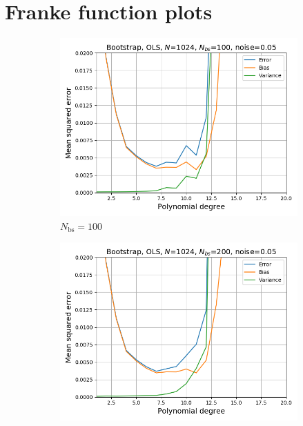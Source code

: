 \documentclass[a4paper]{article}
\begin{document}
\section{Franke function plots} \label{app:Frankeplots}
\begin{figure}[H]
  \centering
  \begin{subfigure}{0.49\textwidth}
    \includegraphics[scale=0.45]{../figures/task_b/bias_variance_N1024_pmax20_nlamb1_noise0.05_seed4155_OLS_boot_Nbs100.png}
    \caption{$N_{\text{bs}} = 100$}
  \end{subfigure}
  \begin{subfigure}{0.49\textwidth}
    \includegraphics[scale=0.45]{../figures/task_b/bias_variance_N1024_pmax20_nlamb1_noise0.05_seed4155_OLS_boot_Nbs200.png}

\end{subfigure}
\end{figure}
\end{document}
